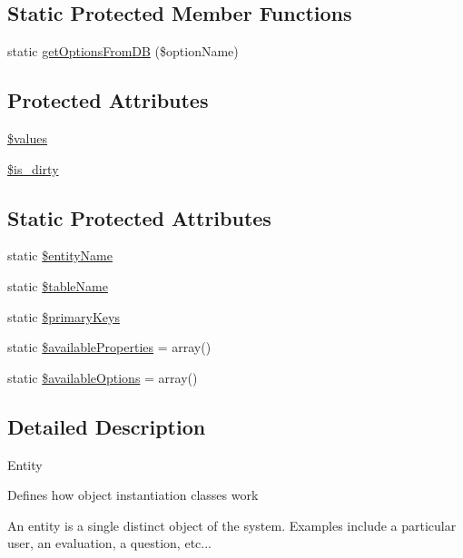 \subsection*{Static Protected Member Functions}
\begin{DoxyCompactItemize}
\item 
static \hyperlink{class_model_a7d0cb594e80ece6fe8fb74445b21b294}{get\-Options\-From\-D\-B} (\$option\-Name)
\end{DoxyCompactItemize}
\subsection*{Protected Attributes}
\begin{DoxyCompactItemize}
\item 
\hyperlink{class_model_add234bffacaa1eb042bb3cfe805412ff}{\$values}
\item 
\hyperlink{class_model_aacea63316fed7c1b23f8ee4a572e300d}{\$is\-\_\-dirty}
\end{DoxyCompactItemize}
\subsection*{Static Protected Attributes}
\begin{DoxyCompactItemize}
\item 
static \hyperlink{class_model_a4459fa5fd5752440a3d4f6e87e1db80f}{\$entity\-Name}
\item 
static \hyperlink{class_model_a85c5c0dd8707dbfee443c8c604835822}{\$table\-Name}
\item 
static \hyperlink{class_model_a25a33c99fb1e18ea88e2eb58957b7818}{\$primary\-Keys}
\item 
static \hyperlink{class_model_ae08a867addf7e3fd5005691a3115ec67}{\$available\-Properties} = array()
\item 
static \hyperlink{class_model_a46fff687f2df94fb22ca2c93b1f6ecc4}{\$available\-Options} = array()
\end{DoxyCompactItemize}


\subsection{Detailed Description}
Entity

Defines how object instantiation classes work

An entity is a single distinct object of the system. Examples include a particular user, an evaluation, a question, etc...

